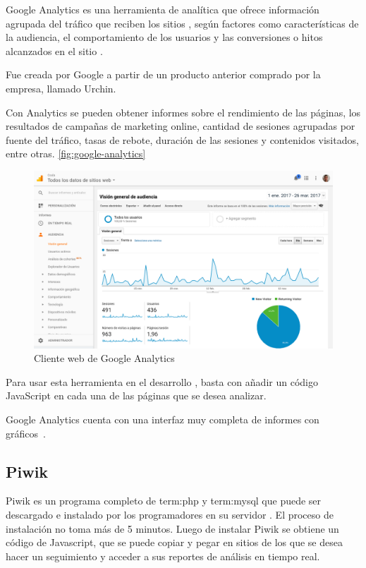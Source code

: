 Google Analytics es una herramienta de analítica  que ofrece
información agrupada del tráfico que reciben los sitios , según
factores como características de la audiencia, el comportamiento de los usuarios
y las conversiones o hitos alcanzados en el sitio .

Fue creada por Google a partir de un producto anterior comprado por la empresa,
llamado Urchin.

Con Analytics se pueden obtener informes sobre el rendimiento de las páginas,
los resultados de campañas de marketing online, cantidad de sesiones agrupadas
por fuente del tráfico, tasas de rebote, duración de las sesiones y contenidos
visitados, entre otras. \autoref{fig:google-analytics}

\begin{figure}
  \includegraphics[width=\linewidth]{src/images/anexos/google-analytics.png}
  \caption{Cliente web de Google Analytics}
  \label{fig:google-analytics}
\end{figure}

Para usar esta herramienta en el desarrollo , basta con añadir un
código JavaScript en cada una de las páginas  que se desea analizar.

Google Analytics cuenta con una interfaz muy completa de informes con
gráficos~\cite{analytics}.

\subsection{Piwik}

Piwik es un programa completo de \gls{term:php} y \gls{term:mysql} que puede ser
descargado e instalado por los programadores en su servidor . El
proceso de instalación no toma más de 5 minutos. Luego de instalar Piwik se
obtiene un código de Javascript, que se puede copiar y pegar en sitios 
de los que se desea hacer un seguimiento y acceder a sus reportes de análisis en
tiempo real.

